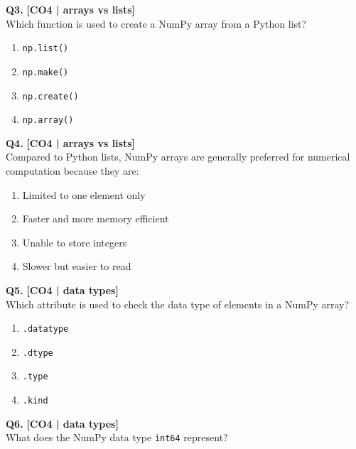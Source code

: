 \noindent\textbf{Q3.} \hfill {\small\color{LPUOrange}\textbf{[CO4 | arrays vs lists]}}\\[2pt]
Which function is used to create a NumPy array from a Python list?

\begin{enumerate}[label=(\alph*),topsep=2pt,itemsep=1pt,partopsep=0pt,parsep=0pt]
    \item \relax \texttt{np.list()}
    \item \relax \texttt{np.make()}
    \item \relax \texttt{np.create()}
    \item \relax \texttt{np.array()}
\end{enumerate}
\vspace{{2mm}}

\noindent\textbf{Q4.} \hfill {\small\color{LPUOrange}\textbf{[CO4 | arrays vs lists]}}\\[2pt]
Compared to Python lists, NumPy arrays are generally preferred for numerical computation because they are:

\begin{enumerate}[label=(\alph*),topsep=2pt,itemsep=1pt,partopsep=0pt,parsep=0pt]
    \item \relax Limited to one element only
    \item \relax Faster and more memory efficient
    \item \relax Unable to store integers
    \item \relax Slower but easier to read
\end{enumerate}
\vspace{{2mm}}

\noindent\textbf{Q5.} \hfill {\small\color{LPUOrange}\textbf{[CO4 | data types]}}\\[2pt]
Which attribute is used to check the data type of elements in a NumPy array?

\begin{enumerate}[label=(\alph*),topsep=2pt,itemsep=1pt,partopsep=0pt,parsep=0pt]
    \item \relax \texttt{.datatype}
    \item \relax \texttt{.dtype}
    \item \relax \texttt{.type}
    \item \relax \texttt{.kind}
\end{enumerate}
\vspace{{2mm}}

\noindent\textbf{Q6.} \hfill {\small\color{LPUOrange}\textbf{[CO4 | data types]}}\\[2pt]
What does the NumPy data type \texttt{int64} represent?

